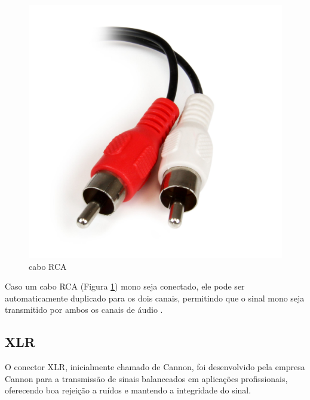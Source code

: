 \begin{figure}[h]
	\centering
    \includegraphics[scale=0.1]{figuras/fig22.png}
	\caption{cabo RCA \cite{rs}}
	\label{fig22}
\end{figure}

Caso um cabo RCA (Figura \ref{fig22}) mono seja conectado, ele pode ser automaticamente duplicado para os dois canais, permitindo que o sinal mono seja transmitido por ambos os canais de áudio \cite{bartlett}.

\subsection{XLR}

O conector XLR, inicialmente chamado de Cannon, foi desenvolvido pela empresa Cannon para a transmissão de sinais balanceados em aplicações profissionais, oferecendo boa rejeição a ruídos e mantendo a integridade do sinal.

